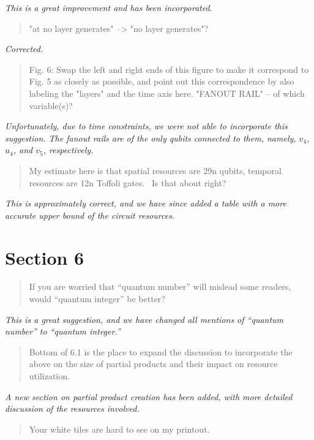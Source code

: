 \documentclass{article}
\theoremstyle{plain} \newtheorem{lemma}{Lemma}
\begin{document}
{\it This is a great improvement and has been incorporated.}

\begin{quote}
"at no layer generates" --> "no layer generates"?
\end{quote}

{\it Corrected.}

\begin{quote}
Fig. 6: Swap the left and right ends of this figure to make it
correspond to Fig. 5 as closely as possible, and point out this
correspondence by also labeling the "layers" and the time axis here.
"FANOUT RAIL" -- of which variable(s)?
\end{quote}

{\it Unfortunately, due to time constraints, we were not able to incorporate this suggestion.
The fanout rails are of the only qubits connected to them, namely, $v_4$, $u_4$, and $v_5$, respectively.}

\begin{quote}
My estimate here is that spatial resources are 29n qubits, temporal
resources are 12n Toffoli gates.  Is that about right?
\end{quote}

{\it This is approximately correct, and we have since added a table with a more accurate
upper bound of the circuit resources.}

\section{Section 6}

\begin{quote}
If you are worried that ``quantum number'' will mislead some readers,
would ``quantum integer'' be better?
\end{quote}

{\it This is a great suggestion, and we have changed all mentions of ``quantum number'' to
``quantum integer.''}

\begin{quote}
Bottom of 6.1 is the place to expand the discussion to incorporate the
above on the size of partial products and their impact on resource
utilization.
\end{quote}

{\it A new section on partial product creation has been added, with more detailed
discussion of the resources involved.}

\begin{quote}
Your white tiles are hard to see on my printout.
\end{quote}
\end{document}
